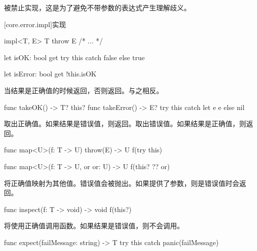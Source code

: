 \pnum
{}被禁止实现，这是为了避免不带参数的表达式产生理解歧义。

[core.error.impl]{实现}

\begin{itemdecl}
impl<T, E> T throw E { /* ... */ }
\end{itemdecl}

\begin{itemdecl}
let isOK: bool {
    get {
        try this catch { false } else { true }
    }
}

let isError: bool {
    get { !this.isOK }
}
\end{itemdecl}

\pnum
{}当结果是正确值的时候返回，否则返回。与之相反。

\begin{itemdecl}
func takeOK() -> T? { this? }
func takeError() -> E? { try this catch let e { e } else { nil } }
\end{itemdecl}

\pnum
{}取出正确值。如果结果是错误值，则返回。取出错误值。如果结果是正确值，则返回。

\begin{itemdecl}
func map<U>(f: T -> U) throw(E) -> U {
    f(try this)
}

func map<U>(f: T -> U, or or: U) -> U {
    f(this? ?? or)
}
\end{itemdecl}

\pnum
{}将正确值映射为其他值。错误值会被抛出。如果提供了参数，则是错误值时会返回。

\begin{itemdecl}
func inspect(f: T -> void) -> void {
    f(this?)
}
\end{itemdecl}

\pnum
{}将使用正确值调用函数。如果结果是错误值，则不会调用。

\begin{itemdecl}
func expect(failMessage: string) -> T {
    try this catch { panic(failMessage) }
}
\end{itemdecl}

